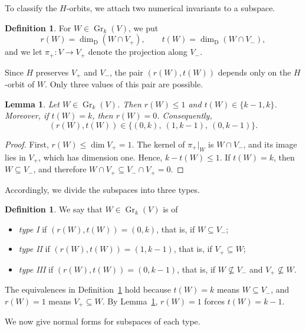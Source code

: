 \documentclass[11pt]{amsart}
\numberwithin{equation}{section}
\theoremstyle{plain}
\newtheorem{lemma}[theorem]{Lemma}
\theoremstyle{definition}
\newtheorem{definition}[theorem]{Definition}
\theoremstyle{remark}
\DeclareMathOperator{\Gr}{Gr}
\begin{document}
To classify the $H$-orbits, we attach two numerical invariants to a subspace.

\begin{definition}\label{def:invariants}
	For $W\in\Gr_k(V)$, we put
	$$
	r(W)=\dim_{\mathrm{D}}(W\cap V_+),\qquad t(W)=\dim_{\mathrm{D}}(W\cap V_-),
	$$
	and we let $\pi_+\colon V\to V_+$ denote the projection along $V_-$.
\end{definition}

Since $H$ preserves $V_+$ and $V_-$, the pair $(r(W),t(W))$ depends only on the $H$-orbit of $W$. Only three values of this pair are possible.

\begin{lemma}\label{lem:invariants}
	Let $W\in\Gr_k(V)$. Then $r(W)\le1$ and $t(W)\in\{k-1,k\}$. Moreover, if $t(W)=k$, then $r(W)=0$. Consequently,
	$$
	(r(W),t(W))\in\{(0,k),\ (1,k-1),\ (0,k-1)\}.
	$$
\end{lemma}

\begin{proof}
	First, $r(W)\le\dim V_+=1$. The kernel of $\pi_+|_W$ is $W\cap V_-$, and its image lies in $V_+$, which has dimension one. Hence, $k-t(W)\le1$. If $t(W)=k$, then $W\subseteq V_-$, and therefore $W\cap V_+\subseteq V_-\cap V_+=0$.
\end{proof}

Accordingly, we divide the subspaces into three types.

\begin{definition}\label{def:types}
	We say that $W\in\Gr_k(V)$ is of
	\begin{itemize}
		\item \emph{type I} if $(r(W),t(W))=(0,k)$, that is, if $W\subseteq V_-$;
		\item \emph{type II} if $(r(W),t(W))=(1,k-1)$, that is, if $V_+\subseteq W$;
		\item \emph{type III} if $(r(W),t(W))=(0,k-1)$, that is, if $W\not\subseteq V_-$ and $V_+\not\subseteq W$.
	\end{itemize}
\end{definition}

The equivalences in Definition~\ref{def:types} hold because $t(W)=k$ means $W\subseteq V_-$, and $r(W)=1$ means $V_+\subseteq W$. By Lemma~\ref{lem:invariants}, $r(W)=1$ forces $t(W)=k-1$.

We now give normal forms for subspaces of each type.
\end{document}
